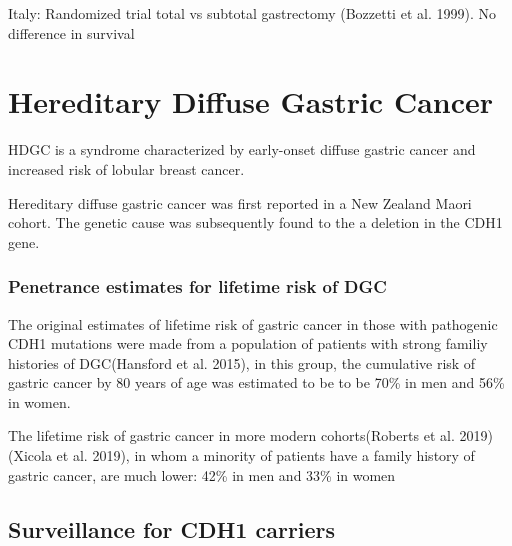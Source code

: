 \documentclass[
  letterpaper,
]{scrbook}
\begin{document}
Italy: Randomized trial total vs subtotal gastrectomy (Bozzetti et al.
1999). No difference in survival

\chapter{Hereditary Diffuse Gastric
Cancer}\label{hereditary-diffuse-gastric-cancer}

HDGC is a syndrome characterized by early-onset diffuse gastric cancer
and increased risk of lobular breast cancer.

Hereditary diffuse gastric cancer was first reported in a New Zealand
Maori cohort. The genetic cause was subsequently found to the a deletion
in the CDH1 gene.

\subsection{Penetrance estimates for lifetime risk of
DGC}\label{penetrance-estimates-for-lifetime-risk-of-dgc}

The original estimates of lifetime risk of gastric cancer in those with
pathogenic CDH1 mutations were made from a population of patients with
strong familiy histories of DGC(Hansford et al. 2015), in this group,
the cumulative risk of gastric cancer by 80 years of age was estimated
to be to be 70\% in men and 56\% in women.

The lifetime risk of gastric cancer in more modern cohorts(Roberts et
al. 2019) (Xicola et al. 2019), in whom a minority of patients have a
family history of gastric cancer, are much lower: 42\% in men and 33\%
in women

\section{Surveillance for CDH1
carriers}\label{surveillance-for-cdh1-carriers}
\end{document}
